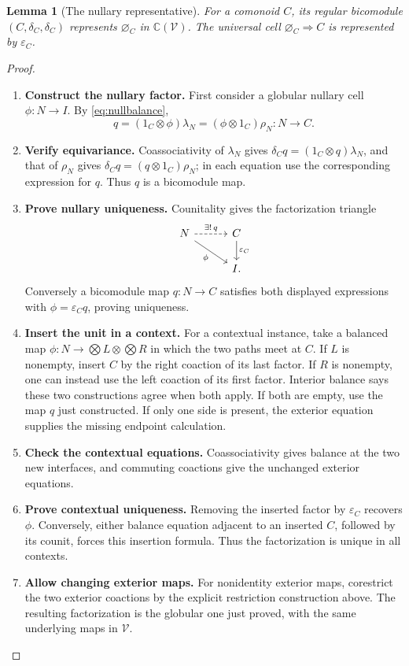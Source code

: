 \documentclass[11pt,reqno]{amsart}
\theoremstyle{plain}
\newtheorem{lemma}[theorem]{Lemma}
\theoremstyle{definition}
\theoremstyle{remark}
\numberwithin{equation}{section}
\newcommand{\V}{\mathcal V}
\newcommand{\Ccal}{\mathbb C}
\newcommand{\cell}{\mathrel{\Longrightarrow}}
\newcommand{\emp}[1]{\varnothing_{#1}}
\newcommand{\eps}{\varepsilon}
\begin{document}
\begin{lemma}[The nullary representative]\label{lem:bicomodunit}
For a comonoid $C$, its regular bicomodule
$(C,\delta_C,\delta_C)$ represents $\emp C$ in $\Ccal(\V)$.
The universal cell $\emp C\cell C$ is represented by $\eps_C$.
\end{lemma}
\begin{proof}\leavevmode
\begin{enumerate}
\item \textbf{Construct the nullary factor.} First consider a globular nullary cell $\phi:N\to I$. By
\cref{eq:nullbalance},
\[
 q=(1_C\otimes\phi)\lambda_N
   =(\phi\otimes1_C)\rho_N:N\to C.
\]

\item \textbf{Verify equivariance.} Coassociativity of $\lambda_N$ gives
$\delta_Cq=(1_C\otimes q)\lambda_N$, and that of $\rho_N$ gives
$\delta_Cq=(q\otimes1_C)\rho_N$; in each equation use the
corresponding expression for $q$. Thus $q$ is a bicomodule map.

\item \textbf{Prove nullary uniqueness.} Counitality gives the factorization triangle
\[
\begin{tikzcd}[column sep=3em]
N \arrow[r,dashed,"\exists!\,q"] \arrow[dr,"\phi"'] &
C \arrow[d,"\eps_C"]\\
& I.
\end{tikzcd}
\]
Conversely a bicomodule map
$q:N\to C$ satisfies both displayed expressions with
$\phi=\eps_Cq$, proving uniqueness.

\item \textbf{Insert the unit in a context.} For a contextual instance, take a balanced map
$\phi:N\to\bigotimes L\otimes\bigotimes R$ in which the two
paths meet at $C$. If $L$ is nonempty, insert $C$ by the right
coaction of its last factor. If $R$ is nonempty, one can instead use
the left coaction of its first factor. Interior balance says these
two constructions agree when both apply. If both are empty, use the
map $q$ just constructed. If only one side is present, the exterior
equation supplies the missing endpoint calculation.

\item \textbf{Check the contextual equations.} Coassociativity
gives balance at the two new interfaces, and commuting coactions give
the unchanged exterior equations.

\item \textbf{Prove contextual uniqueness.} Removing the inserted factor by
$\eps_C$ recovers $\phi$. Conversely, either balance equation
adjacent to an inserted $C$, followed by its counit, forces this
insertion formula. Thus the factorization is unique in all contexts.

\item \textbf{Allow changing exterior maps.} For nonidentity exterior maps, corestrict the two exterior coactions
by the explicit restriction construction above. The resulting
factorization is the globular one just proved, with the same underlying
maps in $\V$.\qedhere
\end{enumerate}
\end{proof}
\end{document}
